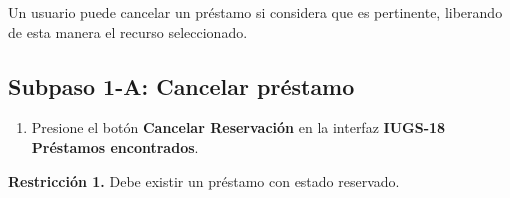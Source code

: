 Un usuario puede cancelar un préstamo si considera que es pertinente, liberando de esta manera
el recurso seleccionado.

\subsection{Subpaso 1-A: Cancelar préstamo}
\begin{enumerate}
	\item Presione el botón \textbf{Cancelar Reservación} en la interfaz
    \textbf{IUGS-18 Préstamos encontrados}.
\end{enumerate}

\textbf{Restricción 1.} Debe existir un préstamo con estado reservado.
